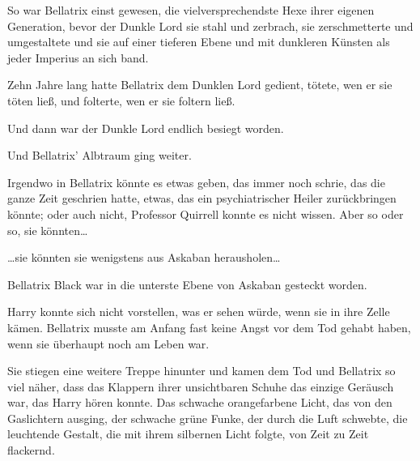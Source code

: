 So war Bellatrix einst gewesen, die vielversprechendste Hexe ihrer eigenen Generation, bevor der Dunkle Lord sie stahl und zerbrach, sie zerschmetterte und umgestaltete und sie auf einer tieferen Ebene und mit dunkleren Künsten als jeder Imperius an sich band.

Zehn Jahre lang hatte Bellatrix dem Dunklen Lord gedient, tötete, wen er sie töten ließ, und folterte, wen er sie foltern ließ.

Und dann war der Dunkle Lord endlich besiegt worden.

Und Bellatrix' Albtraum ging weiter.

Irgendwo in Bellatrix könnte es etwas geben, das immer noch schrie, das die ganze Zeit geschrien hatte, etwas, das ein psychiatrischer Heiler zurückbringen könnte; oder auch nicht, Professor Quirrell konnte es nicht wissen. Aber so oder so, sie könnten…

…sie könnten sie wenigstens aus Askaban herausholen…

Bellatrix Black war in die unterste Ebene von Askaban gesteckt worden.

Harry konnte sich nicht vorstellen, was er sehen würde, wenn sie in ihre Zelle kämen. Bellatrix musste am Anfang fast keine Angst vor dem Tod gehabt haben, wenn sie überhaupt noch am Leben war.

Sie stiegen eine weitere Treppe hinunter und kamen dem Tod und Bellatrix so viel näher, dass das Klappern ihrer unsichtbaren Schuhe das einzige Geräusch war, das Harry hören konnte. Das schwache orangefarbene Licht, das von den Gaslichtern ausging, der schwache grüne Funke, der durch die Luft schwebte, die leuchtende Gestalt, die mit ihrem silbernen Licht folgte, von Zeit zu Zeit flackernd.

